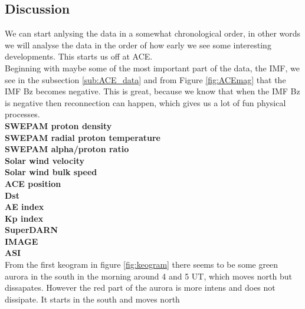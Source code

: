 \documentclass[norsk,a4paper,12pt]{article}
\begin{document}
\begin{multicols}{2}


\section{Discussion} %
\label{sec:discussion}
We can start anlysing the data in a somewhat chronological order, in other words we will analyse the data in the order of how early we see some interesting developments. This starts us off at ACE.\\

Beginning with maybe some of the most important part of the data, the IMF, we see in the subsection \ref{sub:ACE_data} and from Figure \ref{fig:ACEmag} that the IMF Bz becomes negative. This is great, because we know that when the IMF Bz is negative then reconnection can happen, which gives us a lot of fun physical processes. 
\\


\textbf{SWEPAM proton density}\\


\textbf{SWEPAM radial proton temperature}\\


\textbf{SWEPAM alpha/proton ratio}\\


\textbf{Solar wind velocity}\\


\textbf{Solar wind bulk speed}\\


\textbf{ACE position}\\


\textbf{Dst}\\


\textbf{AE index}\\


\textbf{Kp index}\\


\textbf{SuperDARN}\\


\textbf{IMAGE}\\


\textbf{ASI}\\
From the first keogram in figure \ref{fig:keogram} there seems to be some green aurora in the south in the morning around 4 and 5 UT, which moves north but dissapates. However the red part of the aurora is more intens and does not dissipate. It starts in the south and moves north











\end{multicols}
\end{document}
